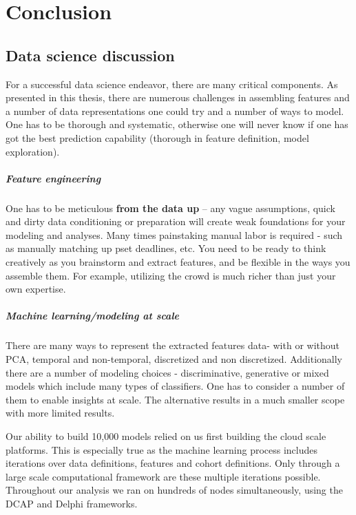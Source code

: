 \chapter{Conclusion}\label{chap:conc}
\section{Data science discussion}
For a successful data science endeavor, there are many critical components. As presented in this thesis, there are numerous challenges in assembling features and a number of data representations one could try and a number of ways to model.  One has to be thorough and systematic, otherwise one will never know if one has got the best prediction capability (thorough in feature definition, model exploration).

\paragraph{Feature engineering}
One has to be meticulous \textbf{from the data up} -- any vague assumptions, quick and dirty data conditioning or preparation will create weak foundations for your modeling and analyses. Many times painstaking manual labor is required - such as manually matching up pset deadlines, etc. You need to be ready to think creatively as you brainstorm and extract features, and be flexible in the ways you assemble them. For example, utilizing the crowd is much richer than just your own expertise.

\paragraph{Machine learning/modeling at scale} 
There are many ways to represent the extracted features data- with or without PCA, temporal and non-temporal, discretized and non discretized. Additionally there are a number of modeling choices - discriminative, generative or mixed models which include many types of classifiers. One has to consider a number of them to enable insights at scale. The alternative results in a much smaller scope with more limited results.

Our ability to build 10,000 models relied on us first building the cloud scale platforms. This is especially true as the machine learning process includes iterations over data definitions, features and cohort definitions. Only through a large scale computational framework are these multiple iterations possible. Throughout our analysis we ran on hundreds of nodes simultaneously, using the DCAP and Delphi frameworks. 

